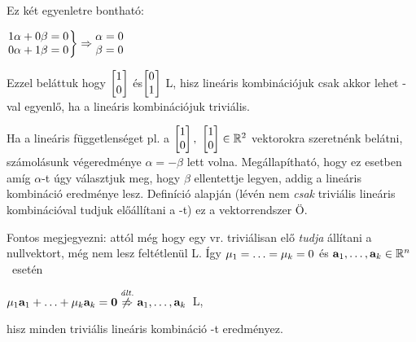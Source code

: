 \documentclass[a4paper,11.5pt]{article}
\begin{document}
	\noindent Ez két egyenletre bontható:
	
	\begin{center}
		$\left.\begin{matrix}
		1\alpha+0\beta = 0\s \\
		0\alpha+1\beta = 0\s \\
	\end{matrix}\right\} \Rightarrow
	\begin{matrix}
		\alpha=0\s\\
		\beta=0\s\\
	\end{matrix}$
	\end{center}
	
	\noindent Ezzel beláttuk hogy
	$\begin{bmatrix}
		1\s\\
		0\s \\
	\end{bmatrix}$ és$
	\begin{bmatrix}
		0\s\\
		1\s \\
	\end{bmatrix}$ L, hisz lineáris kombinációjuk csak akkor lehet \0-val egyenlő, ha a lineáris kombinációjuk triviális. 
	
	Ha a lineáris függetlenséget pl. a $\begin{bmatrix}
		1\\
		0
	\end{bmatrix},\ 
	\begin{bmatrix}
		1\
	\end{bmatrix}\in\R^2$ vektorokra szeretnénk belátni, számolásunk végeredménye $\alpha=-\beta$ lett volna. Megállapítható, hogy ez esetben amíg $\alpha$-t úgy választjuk meg, hogy $\beta$ ellentettje legyen, addig a lineáris kombináció eredménye \0 lesz. Definíció alapján (lévén nem \textit{csak} triviális lineáris kombinációval tudjuk előállítani a \0-t) ez a vektorrendszer Ö.
	
	Fontos megjegyezni: attól még hogy egy vr. triviálisan elő \emph{tudja} állítani a nullvektort, még nem lesz feltétlenül L. Így $\mu_1=\ldots=\mu_k=0$ és $\textbf{a}_1,\ldots, \textbf{a}_k \in \mathbb{R}^{n}$~esetén  \begin{center}
		$\mu_1\textbf{a}_1+\ldots+\mu_k\textbf{a}_k=\textbf{0} \stackrel{\text{\textit{ált.}}}{\not\Rightarrow}\textbf{a}_1,\ldots, \textbf{a}_k $~L,
	\end{center}
	\noindent hisz minden triviális lineáris kombináció \0-t eredményez.
	
\end{document}
